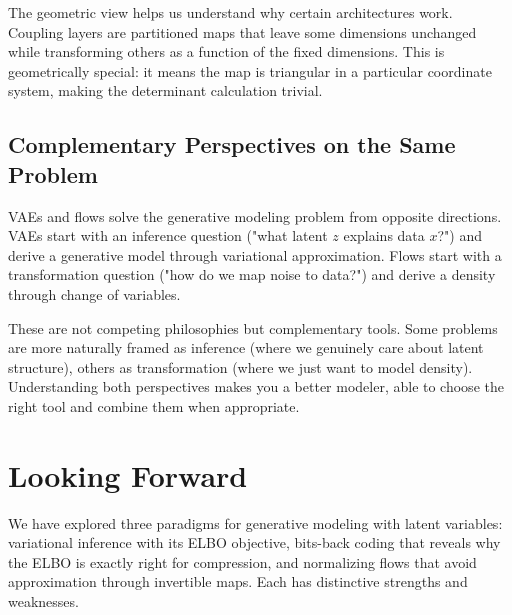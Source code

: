 \vspace{0.3cm}

The geometric view helps us understand why certain architectures work. Coupling layers are partitioned maps that leave some dimensions unchanged while transforming others as a function of the fixed dimensions. This is geometrically special: it means the map is triangular in a particular coordinate system, making the determinant calculation trivial.

\vspace{1.5em}

\subsection{Complementary Perspectives on the Same Problem}

VAEs and flows solve the generative modeling problem from opposite directions. VAEs start with an inference question ("what latent $z$ explains data $x$?") and derive a generative model through variational approximation. Flows start with a transformation question ("how do we map noise to data?") and derive a density through change of variables.

\vspace{0.3cm}

These are not competing philosophies but complementary tools. Some problems are more naturally framed as inference (where we genuinely care about latent structure), others as transformation (where we just want to model density). Understanding both perspectives makes you a better modeler, able to choose the right tool and combine them when appropriate.

\vspace{2em}

\section{Looking Forward}
\label{sec:looking_forward}

\vspace{1em}

We have explored three paradigms for generative modeling with latent variables: variational inference with its ELBO objective, bits-back coding that reveals why the ELBO is exactly right for compression, and normalizing flows that avoid approximation through invertible maps. Each has distinctive strengths and weaknesses.

\vspace{0.3cm}

